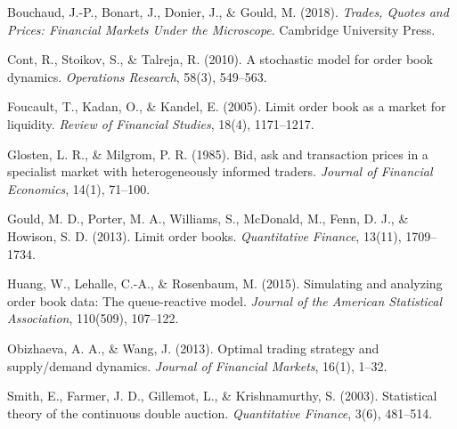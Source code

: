 \documentclass[11pt]{article}
\begin{document}
\begin{list}{}{\setlength{\leftmargin}{1.5em}\setlength{\itemindent}{-1.5em}\setlength{\itemsep}{2pt}\setlength{\parsep}{0pt}}

\item Bouchaud, J.-P., Bonart, J., Donier, J., \& Gould, M. (2018). \emph{Trades,
Quotes and Prices: Financial Markets Under the Microscope}. Cambridge
University Press.

\item Cont, R., Stoikov, S., \& Talreja, R. (2010). A stochastic model for order
book dynamics. \emph{Operations Research}, 58(3), 549--563.

\item Foucault, T., Kadan, O., \& Kandel, E. (2005). Limit order book as a market
for liquidity. \emph{Review of Financial Studies}, 18(4), 1171--1217.

\item Glosten, L. R., \& Milgrom, P. R. (1985). Bid, ask and transaction prices in
a specialist market with heterogeneously informed traders. \emph{Journal of
Financial Economics}, 14(1), 71--100.

\item Gould, M. D., Porter, M. A., Williams, S., McDonald, M., Fenn, D. J., \&
Howison, S. D. (2013). Limit order books. \emph{Quantitative Finance}, 13(11),
1709--1734.

\item Huang, W., Lehalle, C.-A., \& Rosenbaum, M. (2015). Simulating and analyzing
order book data: The queue-reactive model. \emph{Journal of the American
Statistical Association}, 110(509), 107--122.

\item Obizhaeva, A. A., \& Wang, J. (2013). Optimal trading strategy and
supply/demand dynamics. \emph{Journal of Financial Markets}, 16(1), 1--32.

\item Smith, E., Farmer, J. D., Gillemot, L., \& Krishnamurthy, S. (2003).
Statistical theory of the continuous double auction. \emph{Quantitative
Finance}, 3(6), 481--514.

\end{list}
\end{document}
